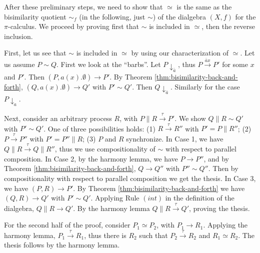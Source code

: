 \documentclass[orivec]{llncs}
\newcommand{\tr}[1]{\stackrel{#1}{\longrightarrow}}
\newcommand{\utr}{\to}
\newcommand{\sbe}{\simeq}
\newcommand{\proend}{\medskip}
\renewenvironment{proof}{\begin{pro}}{\proend\end{pro}}
\begin{document}
\begin{proof}
 
 \medskip 

 \noindent After these preliminary steps, we need to show that $\sbe$ is the same as the bisimilarity quotient $\sim_f$ (in the following, just $\sim$) of the dialgebra $(X,f)$ for the $\pi$-calculus. We proceed by proving first that $\sim$ is included in $\sbe$, then the reverse inclusion.


 \noindent First, let us see that $\sim$ is included in $\sbe$ by using our characterization of $\sbe$. Let us assume $P\sim Q$. First we look at the ``barbs''. Let $P \downarrow_{\bar a}$, thus $P \tr{\bar a x} P'$ for some $x$ and $P'$. 
 Then 
$(P,a(x).\emptyset) \utr P'$. By Theorem \ref{thm:bisimilarity-back-and-forth}, $(Q,a(x).\emptyset) \utr Q'$ with $P' \sim Q'$. Then $Q \downarrow_{\bar a}$. Similarly for the case $P \downarrow_{a}$. 
 
 \medskip
 
 
 \noindent Next, consider an arbitrary process $R$, with $P \parallel R \tr \tau P'$. We show $Q \parallel R \sim Q'$ with $P' \sim Q'$. One of three possibilities holds: (1) $R \tr \tau R''$ with $P' = P \parallel R''$; (2) $P \tr \tau P''$ with $P' = P'' \parallel R$; (3) $P$ and $R$ synchronize. In Case 1, we have $Q \parallel R \tr \tau Q \parallel R''$, thus we use compositionality of $\sim$ with respect to parallel composition. In Case 2, by the harmony lemma, we have $P \utr P''$, and by Theorem \ref{thm:bisimilarity-back-and-forth}, $Q \utr Q''$ with $P'' \sim Q''$. Then by compositionality with respect to parallel composition we get the thesis. In Case 3, we have 
$(P,R) \utr P'$. By Theorem \ref{thm:bisimilarity-back-and-forth} we have $(Q,R) \utr Q'$ with $P' \sim Q'$. Applying Rule $(int)$ in the definition of the dialgebra, $Q \parallel R \utr Q'$. By the harmony lemma $Q \parallel R \tr \tau Q'$, proving the thesis.
 
 \medskip
 
 \noindent For the second half of the proof, consider $P_1 \sbe P_2$, with  $P_1 \utr R_1$. Applying the harmony lemma, $P_1 \tr{\tau} R_1$, thus there is $R_2$ such that $P_2 \tr{\tau} R_2$ and $R_1 \sbe R_2$. The thesis follows by the harmony lemma.
 

\end{proof}
\end{document}
